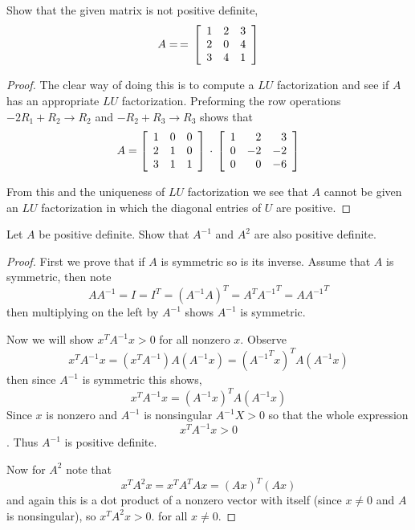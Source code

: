 \newpage 
\question
Show that the given matrix is not positive definite, 
\begin{equation}
    A =\, = \, 
    \mat{rrr}
    1 & 2 & 3 \\ 
    2 & 0 & 4 \\ 
    3 & 4 & 1 
    \rix 
\end{equation}

\begin{proof}
    The clear way of doing this is to compute a $LU$ factorization and see if $A$ has an appropriate $LU$ factorization.
    Preforming the row operations $-2R_1 + R_2 \to R_2$ and $-R_2 + R_3 \to R_3$ shows that 
    \begin{equation}
        A = 
        \mat{rrr}
        1 & 0 & 0 \\ 
        2 & 1 & 0 \\ 
        3 & 1 & 1 
        \rix
        \, \cdot \, 
        \mat{rrr}
        1 & 2 & 3 \\ 
        0 & -2 & -2 \\ 
        0 & 0 & -6 
        \rix
    \end{equation}

    From this and the uniqueness of $LU$ factorization we see that $A$ cannot be given an $LU$ factorization in which the diagonal entries of $U$ are positive. 
\end{proof}

\newpage 
\question 
Let $A$ be positive definite. Show that $A^{-1}$ and $A^2$ are also positive definite. 

\begin{proof}
    First we prove that if $A$ is symmetric so is its inverse. Assume that $A$ is symmetric, then note 
    \[ AA^{-1} = I = I^T = (A^{-1}A)^T = A^T{A^{-1}}^T = A{A^{-1}}^T \]
    then multiplying on the left by $A^{-1}$ shows $A^{-1}$ is symmetric. 

    Now we will show $x^T A^{-1} x > 0$ for all nonzero $x$. Observe 
    \[x^T A^{-1} x  = (x^T A^{-1})A(A^{-1} x) = ({A^{-1}}^Tx)^T A (A^{-1}x) \]
    then since $A^{-1}$ is symmetric this shows, 
    \[x^T A^{-1} x =  (A^{-1}x)^T A (A^{-1}x) \]
    Since $x$ is nonzero and $A^{-1}$ is nonsingular $A^{-1}X > 0$ so that the whole expression 
    \[x^T A^{-1}x > 0\]. 
    Thus $A^{-1}$ is positive definite. 

    Now for $A^2$ note that 
    \[x^TA^2x = x^TA^TAx = (Ax)^T(Ax)\]
    and again this is a dot product of a nonzero vector with itself (since $x \neq 0$ and $A$ is nonsingular), so $x^T A^2 x > 0$. 
    for all $x \neq 0$. 


    
\end{proof}


